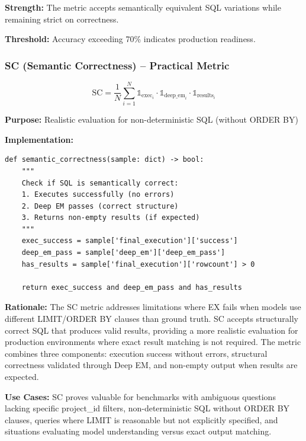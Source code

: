 \textbf{Strength:} The metric accepts semantically equivalent SQL variations while remaining strict on correctness.



\textbf{Threshold:} Accuracy exceeding 70\% indicates production readiness.

\subsubsection{SC (Semantic Correctness) -- Practical Metric}

\begin{equation}
\text{SC} = \frac{1}{N}\sum_{i=1}^{N} \mathbb{1}_{\text{exec}_i} \cdot \mathbb{1}_{\text{deep\_em}_i} \cdot \mathbb{1}_{\text{results}_i}
\end{equation}

\textbf{Purpose:} Realistic evaluation for non-deterministic SQL (without ORDER BY)

\textbf{Implementation:}
\begin{lstlisting}[style=pythonstyle]
def semantic_correctness(sample: dict) -> bool:
    """
    Check if SQL is semantically correct:
    1. Executes successfully (no errors)
    2. Deep EM passes (correct structure)
    3. Returns non-empty results (if expected)
    """
    exec_success = sample['final_execution']['success']
    deep_em_pass = sample['deep_em']['deep_em_pass']
    has_results = sample['final_execution']['rowcount'] > 0
    
    return exec_success and deep_em_pass and has_results
\end{lstlisting}

\textbf{Rationale:} The SC metric addresses limitations where EX fails when models use different LIMIT/ORDER BY clauses than ground truth. SC accepts structurally correct SQL that produces valid results, providing a more realistic evaluation for production environments where exact result matching is not required. The metric combines three components: execution success without errors, structural correctness validated through Deep EM, and non-empty output when results are expected.

\textbf{Use Cases:} SC proves valuable for benchmarks with ambiguous questions lacking specific project\_id filters, non-deterministic SQL without ORDER BY clauses, queries where LIMIT is reasonable but not explicitly specified, and situations evaluating model understanding versus exact output matching.



